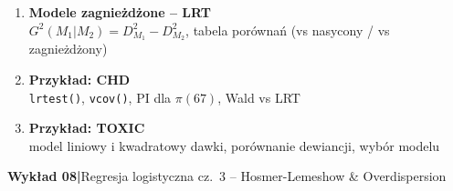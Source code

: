 \documentclass[a4paper,11pt]{article}
\begin{document}
\begin{enumerate}[label=\textbf{\arabic*.}, leftmargin=1.8em, itemsep=3pt, topsep=2pt]
        {\small\color{medgray}definicja, rozkład $\chi^2_{R-p}$}
  \item \textbf{Modele zagnieżdżone -- LRT}\\
        {\small\color{medgray}$G^2(M_1|M_2) = D^2_{M_1} - D^2_{M_2}$, tabela porównań (vs nasycony / vs zagnieżdżony)}
  \item \textbf{Przykład: CHD}\\
        {\small\color{medgray}\texttt{lrtest()}, \texttt{vcov()}, PI dla $\pi(67)$, Wald vs LRT}
  \item \textbf{Przykład: TOXIC}\\
        {\small\color{medgray}model liniowy i kwadratowy dawki, porównanie dewiancji, wybór modelu}
\end{enumerate}
 
\vspace{1em}
 
\begin{mdframed}[
  backgroundcolor=lightblue,
  linecolor=borderblue,
  linewidth=0.8pt,
  innerleftmargin=10pt,
  innerrightmargin=10pt,
  innertopmargin=6pt,
  innerbottommargin=6pt,
  roundcorner=4pt
]
  \textbf{\color{accentblue}Wykład 08\quad|\quad}{\color{darkgray}Regresja logistyczna cz.\ 3 -- Hosmer-Lemeshow \& Overdispersion}
\end{mdframed}
 
\end{document}
